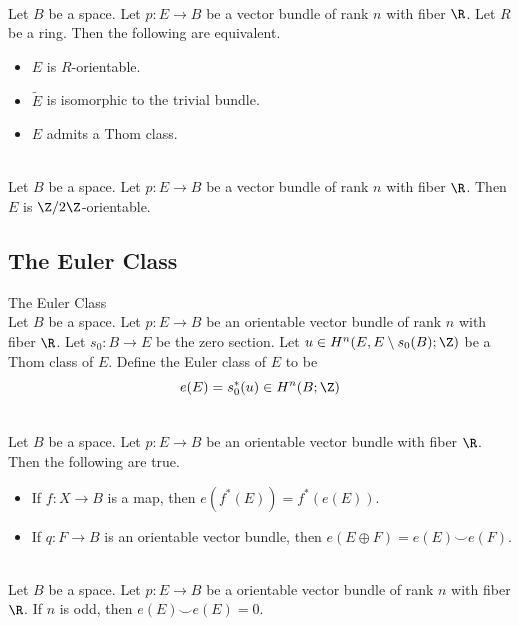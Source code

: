 \documentclass[a4paper]{article}
\begin{document}
\begin{lmm}{}{}\\
Let $B$ be a space. Let $p:E\to B$ be a vector bundle of rank $n$ with fiber $\R$. Let $R$ be a ring. Then the following are equivalent. 
\begin{itemize}
\item $E$ is $R$-orientable. 
\item $\widetilde{E}$ is isomorphic to the trivial bundle. 
\item $E$ admits a Thom class. 
\end{itemize}
\end{lmm}

\begin{crl}{}{}\\
Let $B$ be a space. Let $p:E\to B$ be a vector bundle of rank $n$ with fiber $\R$. Then $E$ is $\Z/2\Z$-orientable. 
\end{crl}

\subsection{The Euler Class}
\begin{defn}{The Euler Class}{}\\
Let $B$ be a space. Let $p:E\to B$ be an orientable vector bundle of rank $n$ with fiber $\R$. Let $s_0:B\to E$ be the zero section. Let $u\in H^n(E,E\setminus s_0(B);\Z)$ be a Thom class of $E$. Define the Euler class of $E$ to be $$e(E)=s_0^\ast(u)\in H^n(B;\Z)$$
\end{defn}

\begin{prp}{}{}\\
Let $B$ be a space. Let $p:E\to B$ be an orientable vector bundle with fiber $\R$. Then the following are true. 
\begin{itemize}
\item If $f:X\to B$ is a map, then $e(f^\ast(E))=f^\ast(e(E))$. 
\item If $q:F\to B$ is an orientable vector bundle, then $e(E\oplus F)=e(E)\smile e(F)$. 
\end{itemize}
\end{prp}

\begin{crl}{}{}\\
Let $B$ be a space. Let $p:E\to B$ be a orientable vector bundle of rank $n$ with fiber $\R$. If $n$ is odd, then $e(E)\smile e(E)=0$. 
\end{crl}
\end{document}
